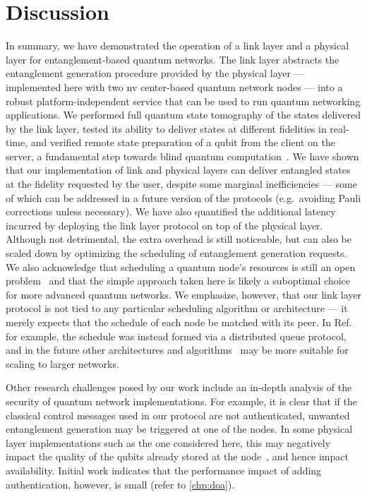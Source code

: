 \section{Discussion}

In summary, we have demonstrated the operation of a link layer and a physical layer for
entanglement-based quantum networks. The link layer abstracts the entanglement generation procedure
provided by the physical layer --- implemented here with two \acrshort{nv} center-based quantum
network nodes --- into a robust platform-independent service that can be used to run quantum
networking applications. We performed full quantum state tomography of the states delivered by the
link layer, tested its ability to deliver states at different fidelities in real-time, and verified
remote state preparation of a qubit from the client on the server, a fundamental step towards blind
quantum computation~\cite{broadbent_2009_ubqc}. We have shown that our implementation of link and
physical layers can deliver entangled states at the fidelity requested by the user, despite some
marginal inefficiencies --- some of which can be addressed in a future version of the protocols
(e.g.~avoiding Pauli corrections unless necessary). We have also quantified the additional latency
incurred by deploying the link layer protocol on top of the physical layer. Although not
detrimental, the extra overhead is still noticeable, but can also be scaled down by optimizing the
scheduling of entanglement generation requests. We also acknowledge that scheduling a quantum node's
resources is still an open problem~\cite{skrzypczyk_2021_arch, vardoyan_2019_performance,
vardoyan_2021_capacity} and that the simple approach taken here is likely a suboptimal choice for
more advanced quantum networks. We emphasize, however, that our link layer protocol is not tied to
any particular scheduling algorithm or architecture --- it merely expects that the schedule of each
node be matched with its peer. In Ref.~\cite{dahlberg_2019_egp} for example, the schedule was
instead formed via a distributed queue protocol, and in the future other architectures and
algorithms~\cite{skrzypczyk_2021_arch} may be more suitable for scaling to larger networks.

Other research challenges posed by our work include an in-depth analysis of the security of quantum
network implementations. For example, it is clear that if the classical control messages used in our
protocol are not authenticated, unwanted entanglement generation may be triggered at one of the
nodes. In some physical layer implementations such as the one considered here, this may negatively
impact the quality of the qubits already stored at the node~\cite{kalb_2018_dephasing}, and hence
impact availability. Initial work indicates that the performance impact of adding authentication,
however, is small (refer to \cref{chp:doa}).

